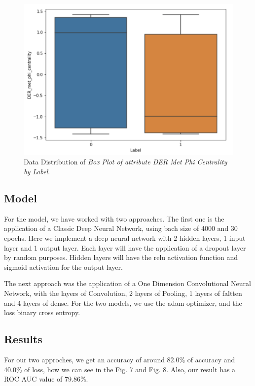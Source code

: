 \documentclass[conference]{IEEEtran}
\begin{document}
\begin{figure}[htbp]
\centerline{\includegraphics[width=\linewidth]{img6.png}}
\caption{Data Distribution of \textit{Box Plot of attribute \textit{DER Met Phi Centrality} by \textit{Label}}.}
\label{fig}
\end{figure}
	 

\subsection{Model}\label{AA}
For the model, we have worked with two approaches. The first one is the application of a Classic Deep Neural Network, using bach size of 4000 and 30 epochs. Here we implement a deep neural network with 2 hidden layers, 1 input layer and 1 output layer. Each layer will have the application of a dropout layer by random purposes. Hidden layers will have the relu activation function and sigmoid activation for the output layer.

The next approach was the application of a One Dimension Convolutional Neural Network, with the layers of Convolution, 2 layers of Pooling, 1 layers of faltten and 4 layers of dense. For the two models, we use the adam optimizer, and the loss binary cross entropy.


\subsection{Results}\label{AA}
For our two approches, we get an accuracy of around 82.0\% of accuracy and 40.0\% of loss, how we can see in the Fig. 7 and Fig. 8. Also, our result has a ROC AUC value of 79.86\%.
\end{document}
